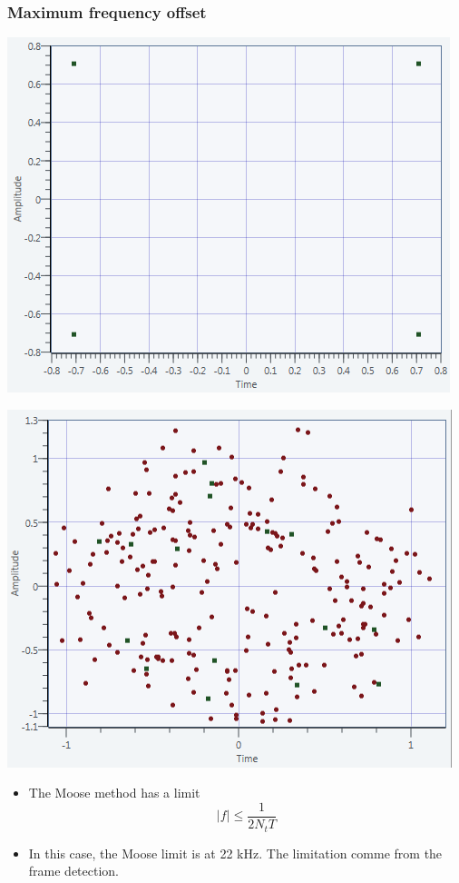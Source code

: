 \documentclass[11pt]{beamer}
\begin{document}
\begin{frame}
\frametitle{Maximum frequency offset}
\begin{minipage}[b]{0.48\linewidth}
        \centering \includegraphics[scale=0.37]{img/Moose_Limit_10k.png}
    \end{minipage}\hfill
    \begin{minipage}[b]{0.48\linewidth}
         \centering \includegraphics[scale=0.37]{img/Moose_Limit_12k.png}
    \end{minipage}
\begin{itemize}
\item The Moose method has a limit 
\begin{equation}
|f| \leq \frac{1}{2N_tT}
\end{equation}
\item In this case, the Moose limit is at 22 kHz. The limitation comme from the frame detection.
\end{itemize}
\end{frame}
\end{document}
